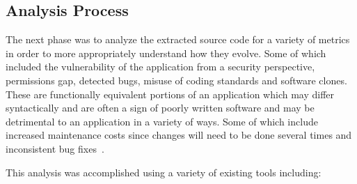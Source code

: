 \documentclass{sig-alternate}
\begin{document}
\subsection{Analysis Process}
\label{sec: analysis}

The next phase was to analyze the extracted source code for a variety of metrics in order to more appropriately understand how they evolve. Some of which included the vulnerability of the application from a security perspective, permissions gap, detected bugs, misuse of coding standards and software clones. These are functionally equivalent portions of an application which may differ syntactically and are often a sign of poorly written software and may be detrimental to an application in a variety of ways. Some of which include increased maintenance costs since changes will need to be done several times and inconsistent bug fixes~\cite{Roy:2009:CEC:1530898.1531101}.

This analysis was accomplished using a variety of existing tools including:
\end{document}
